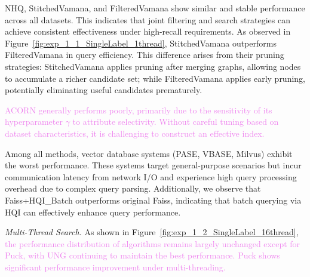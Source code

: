 \documentclass[sigconf, nonacm]{acmart}
\begin{document}
	NHQ, StitchedVamana, and FilteredVamana show similar and stable performance across all datasets. This indicates that joint filtering and search strategies can achieve consistent effectiveness under high-recall requirements. As observed in Figure~\ref{fig:exp_1_1_SingleLabel_1thread}, StitchedVamana outperforms FilteredVamana in query efficiency. This difference arises from their pruning strategies: StitchedVamana applies pruning after merging graphs, allowing nodes to accumulate a richer candidate set; while FilteredVamana applies early pruning, potentially eliminating useful candidates prematurely.
	
	\textcolor{violet}{ACORN generally performs poorly, primarily due to the sensitivity of its hyperparameter $\gamma$ to attribute selectivity. Without careful tuning based on dataset characteristics, it is challenging to construct an effective index.}
	
	Among all methods, vector database systems (PASE, VBASE, Milvus) exhibit the worst performance. These systems target general-purpose scenarios but incur communication latency from network I/O and experience high query processing overhead due to complex query parsing. Additionally, we observe that Faiss+HQI\_Batch outperforms original Faiss, indicating that batch querying via HQI can effectively enhance query performance.
	
	\textit{Multi-Thread Search.}
	As shown in Figure~\ref{fig:exp_1_2_SingleLabel_16thread}, \textcolor{violet}{the performance distribution of algorithms remains largely unchanged except for Puck, with UNG continuing to maintain the best performance. Puck shows significant performance improvement under multi-threading.}
	
\end{document}
